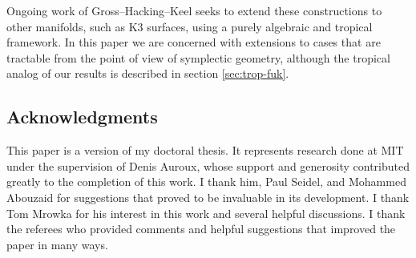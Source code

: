 \documentclass[12pt]{amsart}
\begin{document}



Ongoing work of Gross--Hacking--Keel \cite{gross-hacking-keel} seeks
to extend these constructions to other manifolds, such as K3 surfaces,
using a purely algebraic and tropical framework. In this paper we are
concerned with extensions to cases that are tractable from the point
of view of symplectic geometry, although the tropical analog
of our results is described in section \ref{sec:trop-fuk}.
 


\subsection{Acknowledgments}
\label{sec:acknowledgements}
This paper is a version of my doctoral thesis. It represents research done
at MIT under the supervision of Denis Auroux, whose support and
generosity contributed greatly to the completion of this work. I thank
him, Paul Seidel, and Mohammed Abouzaid for suggestions that proved to be invaluable in its development. I thank Tom Mrowka for
his interest in this work and several helpful discussions. I thank the referees who provided comments and helpful suggestions that improved the paper in many ways.
\end{document}
